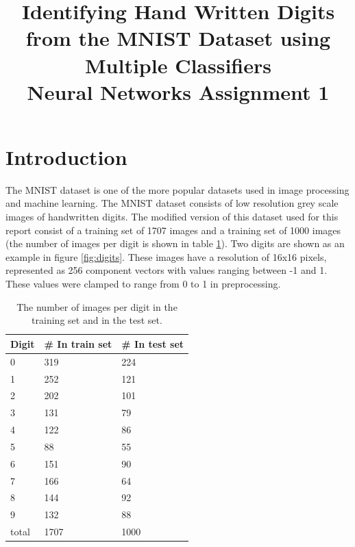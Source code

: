 \documentclass[10 pt, a4paper]{article}
\title{
  Identifying Hand Written Digits from the MNIST Dataset using Multiple Classifiers \\
  \Large Neural Networks Assignment 1
}
\date{}
\begin{document}
\maketitle

\vspace{-2 cm}


\section{Introduction}

The MNIST dataset is one of the more popular datasets used in image processing and machine learning. The MNIST dataset consists of low resolution grey scale images of handwritten digits.  The modified version of this dataset used for this report consist of a training set of 1707 images and a training set of 1000 images (the number of images per digit is shown in table \ref{tab:digits}). Two digits are shown as an example in figure \ref{fig:digits}. These images have a resolution of 16x16 pixels, represented as 256 component vectors with values ranging between -1 and 1. These values were clamped to range from 0 to 1 in preprocessing.

\begin{table}[H] 
\centering
\begin{tabular}{l|ll}
Digit & \# In train set & \# In test set \\ \hline \hline
0     & 319             & 224            \\
1     & 252             & 121            \\
2     & 202             & 101            \\
3     & 131             & 79             \\
4     & 122             & 86             \\
5     & 88              & 55             \\
6     & 151             & 90             \\
7     & 166             & 64             \\
8     & 144             & 92             \\
9     & 132             & 88             \\ \hline
total & 1707            & 1000          
\end{tabular}
\caption{The number of images per digit in the training set and in the test set.}
\label{tab:digits}
\end{table}
\end{document}
